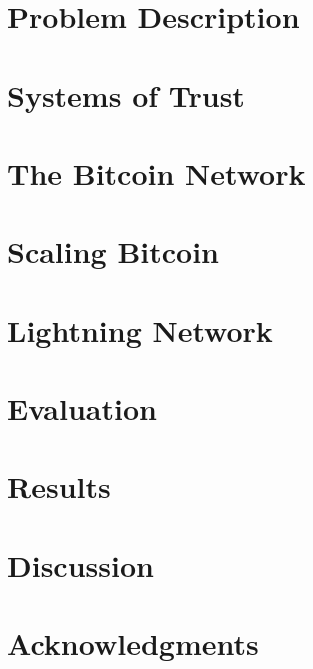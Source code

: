 \section{Problem Description}
    \label{sec:problem}
    

\clearpage
\section{Systems of Trust}
    \label{sec:macroeconomics}
   
\clearpage
\section{The Bitcoin Network}
    \label{sec:bitcoin}
    
\clearpage
\section{Scaling Bitcoin}
    \label{sec:results}
%    
\clearpage
\section{Lightning Network}
\clearpage
\section{Evaluation}
\clearpage
\section{Results}
\clearpage
\section{Discussion}
    \label{sec:discussion}
\clearpage
\section{Acknowledgments}
    \label{sec:acknowledgments}
